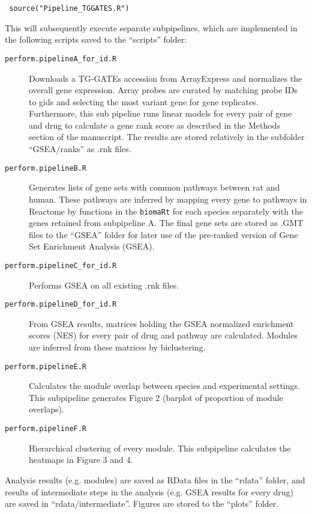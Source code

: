 \documentclass[a4paper,10pt]{scrartcl}
\begin{document}
\begin{verbatim}
 source("Pipeline_TGGATES.R")
\end{verbatim}

This will subsequently execute separate subpipelines, which are implemented in the following scripts saved to the ``scripts'' folder:

\begin{description}
 \item[\texttt{perform.pipelineA\_for\_id.R}] Downloads a TG-GATEs accession from ArrayExpress and normalizes the overall gene expression. Array probes are curated by matching probe IDs to gids and selecting the most variant gene for gene replicates. Furthermore, this sub pipeline runs linear models for every pair of gene and drug to calculate a gene rank score as described in the Methods section of the manuscript. The results are stored relatively in the subfolder ``GSEA/ranks'' as .rnk files.
 \item[\texttt{perform.pipelineB.R}] Generates lists of gene sets with common pathways between rat and human. These pathways are inferred by mapping every gene to pathways in Reactome by functions in the \verb+biomaRt+ for each species separately with the genes retained from subpipeline A. The final gene sets are stored as .GMT files to the ``GSEA'' folder for later use of the pre-ranked version of Gene Set Enrichment Analysis (GSEA).
 \item[\texttt{perform.pipelineC\_for\_id.R}] Performs GSEA on all existing .rnk files.
 \item[\texttt{perform.pipelineD\_for\_id.R}] From GSEA results, matrices holding the GSEA normalized enrichment scores (NES) for every pair of drug and pathway are calculated. Modules are inferred from these matrices by biclustering.
 \item[\texttt{perform.pipelineE.R}] Calculates the module overlap between species and experimental settings. This subpipeline generates Figure 2 (barplot of proportion of module overlaps). 
 \item[\texttt{perform.pipelineF.R}] Hierarchical clustering of every module. This subpipeline calculates the heatmaps in Figure 3 and 4.
\end{description}

Analysis results (e.g. modules) are saved as RData files in the ``rdata'' folder, and results of intermediate steps in the analysis (e.g. GSEA results for every drug) are saved in ``rdata/intermediate''. Figures are stored to the ``plots'' folder.
\end{document}

